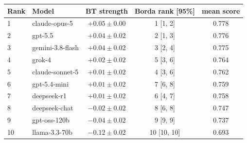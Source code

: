 \begin{tabular}{llccc}
\toprule
Rank & Model & BT strength & Borda rank [95\%] & mean score \\
\midrule
1 & claude-opus-5 & $+0.05 \pm 0.00$ & 1 [1, 2] & 0.778 \\
2 & gpt-5.5 & $+0.04 \pm 0.02$ & 2 [1, 3] & 0.776 \\
3 & gemini-3.8-flash & $+0.04 \pm 0.02$ & 3 [2, 4] & 0.775 \\
4 & grok-4 & $+0.02 \pm 0.02$ & 5 [3, 6] & 0.764 \\
5 & claude-sonnet-5 & $+0.01 \pm 0.02$ & 4 [3, 6] & 0.762 \\
6 & gpt-5.4-mini & $+0.01 \pm 0.02$ & 7 [6, 8] & 0.759 \\
7 & deepseek-r1 & $+0.01 \pm 0.02$ & 6 [4, 7] & 0.758 \\
8 & deepseek-chat & $-0.02 \pm 0.02$ & 8 [6, 8] & 0.747 \\
9 & gpt-oss-120b & $-0.04 \pm 0.02$ & 9 [9, 9] & 0.737 \\
10 & llama-3.3-70b & $-0.12 \pm 0.02$ & 10 [10, 10] & 0.693 \\
\bottomrule
\end{tabular}
